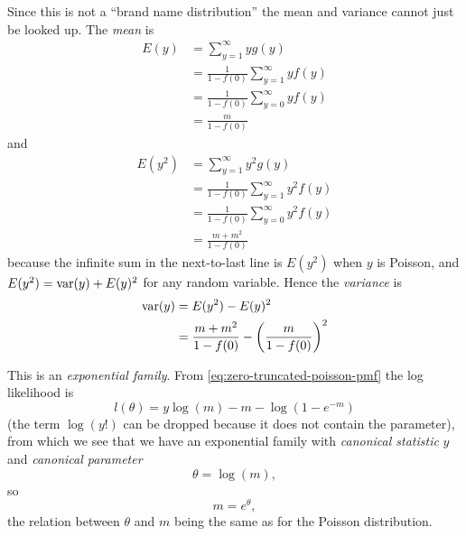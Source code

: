 Since this is not a ``brand name distribution'' the mean and variance
cannot just be looked up.  The \emph{mean} is
\begin{equation} \label{eq:mean-of-zero-truncated-in-terms-of-untruncated}
\begin{split}
   E(y)
   & =
   \sum_{y = 1}^\infty y g(y)
   \\
   & =
   \frac{1}{1 - f(0)} \sum_{y = 1}^\infty y f(y)
   \\
   & =
   \frac{1}{1 - f(0)} \sum_{y = 0}^\infty y f(y)
   \\
   & =
   \frac{m}{1 - f(0)}
\end{split}
\end{equation}
and
\begin{equation}
\label{eq:second-ordinary-moment-of-zero-truncated-in-terms-of-untruncated}
\begin{split}
   E(y^2)
   & =
   \sum_{y = 1}^\infty y^2 g(y)
   \\
   & =
   \frac{1}{1 - f(0)} \sum_{y = 1}^\infty y^2 f(y)
   \\
   & =
   \frac{1}{1 - f(0)} \sum_{y = 0}^\infty y^2 f(y)
   \\
   & =
   \frac{m + m^2}{1 - f(0)}
\end{split}
\end{equation}
because the infinite sum in the next-to-last line is $E(y^2)$ when $y$
is Poisson, and $E(y^2) = \operatorname{var}(y) + E(y)^2$ for any random variable.
Hence the \emph{variance} is
\begin{align*}
   \operatorname{var}(y)
   & =
   E(y^2) - E(y)^2
   \\
   & =
   \frac{m + m^2}{1 - f(0)} - \left( \frac{m}{1 - f(0)} \right)^2
\end{align*}

This is an \emph{exponential family}.
From \eqref{eq:zero-truncated-poisson-pmf} the log likelihood is
$$
   l(\theta) = y \log(m) - m - \log(1 - e^{- m})
$$
(the term $\log(y !)$ can be dropped because it does not contain the
parameter), from which we see that we have an exponential family with
\emph{canonical statistic} $y$ and \emph{canonical parameter}
$$
   \theta = \log(m),
$$
so
$$
   m = e^{\theta},
$$
the relation between $\theta$ and $m$ being the same as for the Poisson
distribution.

